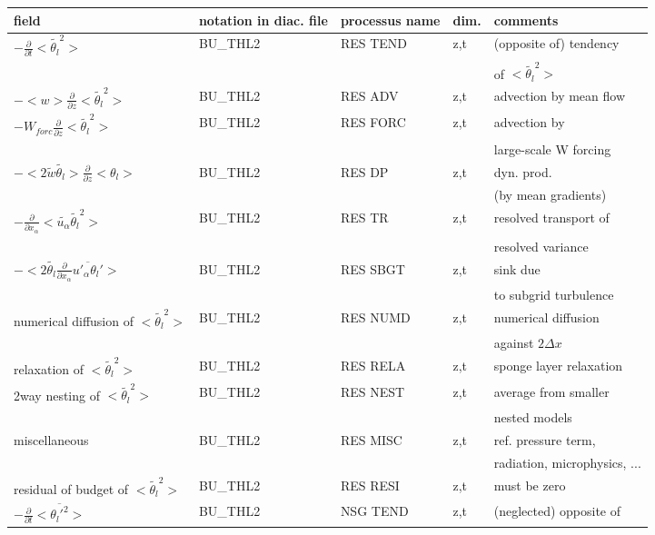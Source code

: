 \begin{center}
\begin{tabular}{||p{5cm}|>{\centering}p{2cm}|>{\centering}p{2.5cm}|>{\centering}p{0.5cm}|p{5.5cm }||}
\hline
\hline
field & notation in diac. file & processus name& dim.  & comments \\
\hline
\hline
$-\frac{\partial }{\partial t}<\tilde{\theta_l}^2>$ & BU\_THL2 & RES TEND & z,t & (opposite of) tendency\\
 & & & &of $<\tilde{\theta_l}^2>$\\
\hline
$-<w>\frac{\partial}{\partial z}<\tilde{\theta_l}^2>$ & BU\_THL2 & RES ADV  & z,t & advection by mean flow \\
\hline
$-W_{forc}\frac{\partial}{\partial z}<\tilde{\theta_l}^2>$ & BU\_THL2 & RES FORC & z,t & advection by \\
 & & & & large-scale W forcing \\
\hline
$-< 2 \tilde{w}\tilde{\theta_l}>\frac{\partial }{\partial z}<\theta_l>$ & BU\_THL2 & RES DP   & z,t & dyn. prod.\\
 & & & &(by mean gradients) \\
\hline
$-\frac{\partial}{\partial x_\alpha} <\tilde{u_\alpha} \tilde{\theta_l}^2>$ & BU\_THL2 & RES TR   & z,t & resolved transport of\\
 & & & &resolved variance \\
\hline
$- <2 \tilde{\theta_l}\frac{\partial}{\partial x_\alpha}\overline{u'_\alpha \theta_l'}>$
& BU\_THL2 & RES SBGT & z,t & sink due \\
 & & & &to subgrid turbulence \\
\hline
{\rm numerical diffusion of } $<\tilde{\theta_l}^2>$& BU\_THL2 & RES NUMD & z,t & numerical diffusion\\
 & & & &against $2\Delta x$ \\
\hline
{\rm relaxation of }$<\tilde{\theta_l}^2>$ & BU\_THL2 & RES RELA & z,t& sponge layer relaxation \\
\hline
{\rm 2way nesting of }$<\tilde{\theta_l}^2>$ & BU\_THL2 & RES NEST & z,t& average from smaller\\
 & & & &nested models \\
\hline
{\rm miscellaneous} & BU\_THL2 & RES MISC & z,t & ref. pressure term, \\
 & & && radiation, microphysics, ... \\
\hline
{\rm residual of budget of} $<\tilde{\theta_l}^2>$ & BU\_THL2 & RES RESI & z,t & must be zero \\
\hline
$-\frac{\partial }{\partial t}<\overline{\theta_l'^2}>$ & BU\_THL2 & NSG TEND & z,t & (neglected) opposite of\\

\end{tabular}
\end{center}
